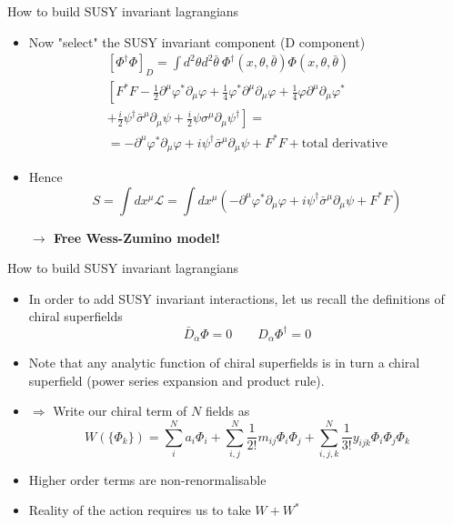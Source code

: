 \documentclass[10pt]{beamer}
\begin{document}
\begin{frame}{How to build SUSY invariant lagrangians}
    \begin{itemize}
        \item Now "select" the SUSY invariant component (D component)
        \begin{gather*}
            \left[\Phi^{\dagger}\Phi\right]_D = \int d^2\theta d^2\bar\theta \ \Phi^{\dagger}(x, \theta, \bar\theta) \Phi(x, \theta, \bar\theta) \\
            \left[F^{*} F - \frac{1}{2} \partial^{\mu} \varphi^{*} \partial_{\mu} \varphi+\frac{1}{4} \varphi^{*} \partial^{\mu} \partial_{\mu} \varphi+\frac{1}{4} \varphi \partial^{\mu} \partial_{\mu} \varphi^{*}\right. \\
                    \left.+\frac{i}{2} \psi^{\dagger} \bar{\sigma}^{\mu} \partial_{\mu} \psi+\frac{i}{2} \psi \sigma^{\mu} \partial_{\mu} \psi^{\dagger}\right] = \\
            = -\partial^{\mu}\varphi^*\partial_{\mu}\varphi + i\psi^{\dagger}\bar\sigma^{\mu}\partial_{\mu}\psi + F^{*}F + \text{total derivative}
        \end{gather*}
        \item Hence 
        \begin{equation*}
            \boxed{S = \int dx^{\mu} \mathcal{L} = \int dx^{\mu} \left( -\partial^{\mu}\varphi^{*}\partial_{\mu}\varphi + i\psi^{\dagger}\bar\sigma^{\mu}\partial_{\mu}\psi + F^{*}F \right)}
        \end{equation*}
        \centerline{\bfseries $\rightarrow$ Free Wess-Zumino model!}
    \end{itemize}
\end{frame}

\begin{frame}{How to build SUSY invariant lagrangians}
    \begin{itemize}
        \item In order to add SUSY invariant interactions, let us recall the definitions of chiral superfields 
            \begin{equation*}
                \bar D_{\dot\alpha} \Phi = 0 \qquad D_{\alpha} \Phi^{\dagger} = 0
            \end{equation*}
        \item Note that any analytic function of chiral superfields is in turn a chiral superfield (power series expansion and product rule). \\
        \item $\Rightarrow$ Write our chiral term of $N$ fields as 
            \begin{equation*}
                W(\{\Phi_k\}) = \sum_i^N a_i \Phi_i + \sum_{i,j}^N \frac{1}{2!} m_{ij} \Phi_{i}\Phi_j + \sum_{i,j,k}^N \frac{1}{3!} y_{ijk} \Phi_i \Phi_j \Phi_k
            \end{equation*}
        \item Higher order terms are non-renormalisable \\
        \item Reality of the action requires us to take $W + W^*$
    \end{itemize}
\end{frame}
\end{document}
